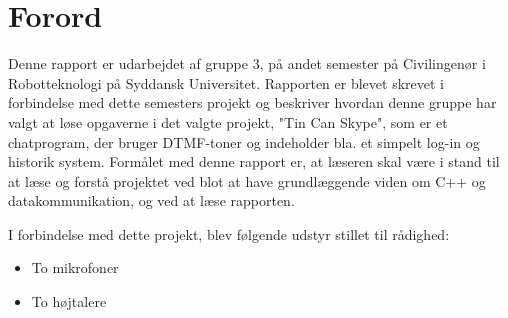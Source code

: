 \section{Forord}
Denne rapport er udarbejdet af gruppe 3, på andet semester på Civilingenør i Robotteknologi på Syddansk Universitet.
Rapporten er blevet skrevet i forbindelse med dette semesters projekt og beskriver hvordan denne gruppe har valgt at løse opgaverne i det valgte projekt, "Tin Can Skype", som er et chatprogram, der bruger DTMF-toner og indeholder bla. et simpelt log-in og historik system. 
\newline
Formålet med denne rapport er, at læseren skal være i stand til at læse og forstå projektet ved blot at have grundlæggende viden om C++ og datakommunikation, og ved at læse rapporten. 
\newline
\par
I forbindelse med dette projekt, blev følgende udstyr stillet til rådighed:
\begin{itemize}
	\item To mikrofoner
	\item To højtalere
\end{itemize}
